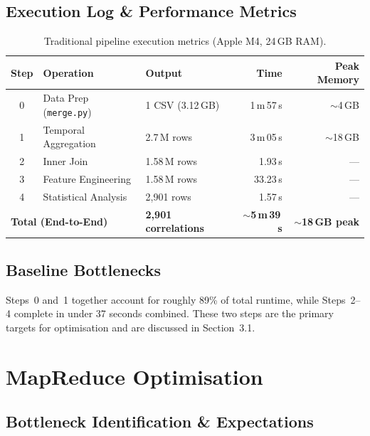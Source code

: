 \documentclass[11pt]{article}
\begin{document}
\subsection{Execution Log \& Performance Metrics}

\begin{table}[H]
\centering
\caption{Traditional pipeline execution metrics (Apple M4, 24\,GB RAM).}
\label{tab:baseline}
\renewcommand{\arraystretch}{1.15}
\small
\begin{tabularx}{\textwidth}{c l X r r}
\toprule
\textbf{Step} & \textbf{Operation} & \textbf{Output} & \textbf{Time} & \textbf{Peak Memory} \\
\midrule
0 & Data Prep (\texttt{merge.py}) & 1 CSV (3.12\,GB) & 1\,m\,57\,s & $\sim$4\,GB \\
1 & Temporal Aggregation         & 2.7\,M rows      & 3\,m\,05\,s & $\sim$18\,GB \\
2 & Inner Join                   & 1.58\,M rows     & 1.93\,s     & --- \\
3 & Feature Engineering          & 1.58\,M rows     & 33.23\,s    & --- \\
4 & Statistical Analysis         & 2,901 rows       & 1.57\,s     & --- \\
\midrule
\multicolumn{2}{l}{\textbf{Total (End-to-End)}} & \textbf{2,901 correlations} & \textbf{$\sim$5\,m\,39\,s} & \textbf{$\sim$18\,GB peak} \\
\bottomrule
\end{tabularx}
\end{table}

\subsection{Baseline Bottlenecks}

Steps~0 and~1 together account for roughly 89\% of total runtime, while Steps~2--4 complete in under 37 seconds combined. These two steps are the primary targets for optimisation and are discussed in Section~3.1.

\section{MapReduce Optimisation}

\subsection{Bottleneck Identification \& Expectations}
\end{document}
